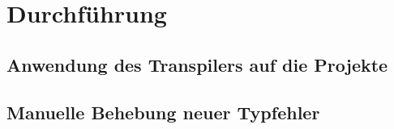 \chapter{Durchführung}
\label{chap:execution}

\section{Anwendung des Transpilers auf die Projekte}
\section{Manuelle Behebung neuer Typfehler}
